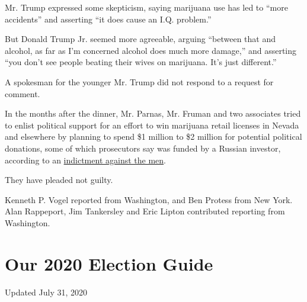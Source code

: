 Mr. Trump expressed some skepticism, saying marijuana use has led to
``more accidents'' and asserting ``it does cause an I.Q. problem.''

But Donald Trump Jr. seemed more agreeable, arguing ``between that and
alcohol, as far as I'm concerned alcohol does much more damage,'' and
asserting ``you don't see people beating their wives on marijuana. It's
just different.''

A spokesman for the younger Mr. Trump did not respond to a request for
comment.

In the months after the dinner, Mr. Parnas, Mr. Fruman and two
associates tried to enlist political support for an effort to win
marijuana retail licenses in Nevada and elsewhere by planning to spend
\$1 million to \$2 million for potential political donations, some of
which prosecutors say was funded by a Russian investor, according to an
\href{https://www.nytimes.com/2019/10/10/us/politics/lev-parnas-igor-fruman-arrested-giuliani.html}{indictment
against the men}.

They have pleaded not guilty.

Kenneth P. Vogel reported from Washington, and Ben Protess from New
York. Alan Rappeport, Jim Tankersley and Eric Lipton contributed
reporting from Washington.

\hypertarget{our-2020-election-guide}{%
\section{Our 2020 Election Guide}\label{our-2020-election-guide}}

Updated July 31, 2020

